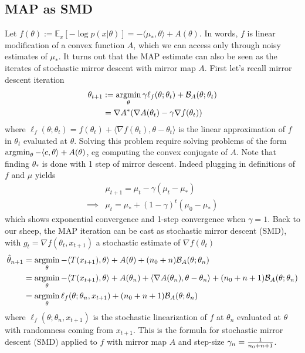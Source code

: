 \documentclass{article}
\newcommand*{\expect}[2][]{\ensuremath{\mathbb{E}_{#1} \left[ #2 \right] }} %
\newcommand{\logpart}{A}
\newcommand{\conj}{\logpart^*}
\newcommand{\bregman}{\cB_\logpart}
\newcommand{\natp}{\theta}
\newcommand{\linear}{\ell} %
\newcommand{\lr}{\gamma} %
\begin{document}
\subsection{MAP as SMD}
Let $f(\natp) := \expect[x]{-\log p(x|\natp)} = - \langle \mu_*, \natp\rangle + \logpart(\natp)$. In words, $f$ is linear modification of a convex function $\logpart$, which we can access only through noisy estimates of $\mu_*$. It turns out that the MAP estimate can also be seen as the iterates of stochastic mirror descent with mirror map $\logpart$. First let's recall mirror descent iteration
\begin{align}
	\natp_{t+1} 
	&:= \argmin_\natp \lr \linear_f(\natp; \natp_t) + \bregman(\natp ; \natp_t)  \\
	& = \nabla \conj (\nabla \logpart(\natp_t) - \lr \nabla f(\natp_t))
\end{align}
where $\linear_f(\natp; \natp_t) = f(\natp_t) + \langle \nabla f(\natp_t), \natp - \natp_t \rangle$ is the linear approximation of $f$ in $\natp_t$ evaluated at $\natp$. Solving this problem require solving problems of the form $\argmin_\natp - \langle c, \natp \rangle + \logpart(\natp)$, eg computing the convex conjugate of $\logpart$. 
Note that finding $\natp_*$ is done with 1 step of mirror descent. Indeed plugging in definitions of $f$ and $\mu$ yields
\begin{align}
	&\mu_{t+1}  = \mu_t - \lr (\mu_t - \mu_*) \\
	\implies &\mu_t  = \mu_* + (1- \lr)^t (\mu_0 - \mu_*)
\end{align}
which shows exponential convergence and 1-step convergence when $\lr =1$. Back to our sheep, the MAP iteration can be cast as stochastic mirror descent (SMD),  with $g_t = \nabla f(\natp_t, x_{t+1})$ a stochastic estimate  of $\nabla f(\natp_t)$
\begin{align}
    \hat \natp_{n+1} 
    &= \argmin_\natp 
    - \langle T(x_{t+1}), \natp \rangle  + \logpart(\natp) + (n_0 + n) \bregman(\natp ; \natp_n) \\
    &= \argmin_\natp - \langle T(x_{t+1}), \natp \rangle   + \logpart(\natp_n) + \langle \nabla \logpart(\natp_n)  , \natp - \natp_n \rangle + (n_0+n + 1) \bregman(\natp ; \natp_n) \\
    &= \argmin_\natp \linear_f(\natp;\natp_n, x_{t+1}) + (n_0 + n + 1) \bregman(\natp ; \natp_n)
\end{align}
where $\linear_f(\natp;\natp_n, x_{t+1})$ is the stochastic linearization of $f$ at $\natp_n$ evaluated at $\natp$ with randomness coming from $x_{t+1}$. This is the formula for stochastic mirror descent (SMD) applied to $f$ with mirror map $\logpart$ and step-size $\gamma_n = \frac{1}{n_0 + n + 1}$.
\end{document}
